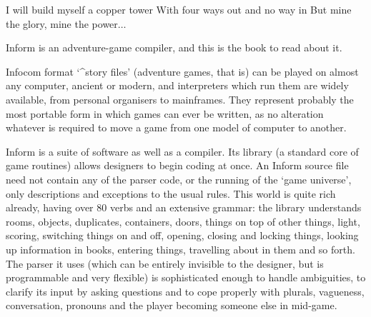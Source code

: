 %

%

%

%
\endgroup
\bigskip

%

%

%

%

\tenpoint
\newpage
{}
\titletrue

\poem
I will build myself a copper tower
With four ways out and no way in
But mine the glory, mine the power$\ldots$

\noindent
Inform is an adventure-game compiler, and this is the book to read about it.

Infocom format `^{story files}' (adventure games, that is) can be played on
almost any computer, ancient or modern, and interpreters which run them are
widely available, from personal organisers to mainframes.  They represent
probably the most portable form in which games can ever be written, as no
alteration whatever is required to move a game from one model of computer to
another.

Inform is a suite of software as well as a compiler.  Its library (a
standard core of game routines) allows designers to begin coding at once. 
An Inform source file need not contain any of the parser code, or the
running of the `game universe', only descriptions and exceptions to the
usual rules.  This world is quite rich already, having over 80 verbs and an
extensive grammar: the library understands rooms, objects, duplicates,
containers, doors, things on top of other things, light, scoring, switching
things on and off, opening, closing and locking things, looking up
information in books, entering things, travelling about in them and so
forth.  The parser it uses (which can be entirely invisible to the designer,
but is programmable and very flexible) is sophisticated enough to handle
ambiguities, to clarify its input by asking questions and to cope properly
with plurals, vagueness, conversation, pronouns and the player becoming
someone else in mid-game.

\bigskip

